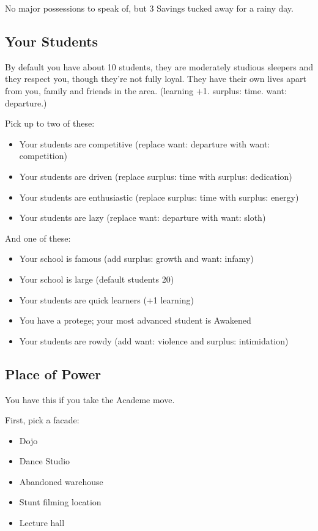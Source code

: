 \documentclass[
]{memoir}
\begin{document}
No major possessions to speak of, but 3 Savings tucked away for a rainy
day.

\hypertarget{your-students}{%
\subsection{Your Students}\label{your-students}}

By default you have about 10 students, they are moderately studious
sleepers and they respect you, though they're not fully loyal. They have
their own lives apart from you, family and friends in the area.
(learning +1. surplus: time. want: departure.)

Pick up to two of these:

\begin{itemize}
\tightlist
\item
  Your students are competitive (replace want: departure with want:
  competition)
\item
  Your students are driven (replace surplus: time with surplus:
  dedication)
\item
  Your students are enthusiastic (replace surplus: time with surplus:
  energy)
\item
  Your students are lazy (replace want: departure with want: sloth)
\end{itemize}

And one of these:

\begin{itemize}
\tightlist
\item
  Your school is famous (add surplus: growth and want: infamy)
\item
  Your school is large (default students 20)
\item
  Your students are quick learners (+1 learning)
\item
  You have a protege; your most advanced student is Awakened
\item
  Your students are rowdy (add want: violence and surplus: intimidation)
\end{itemize}

\hypertarget{place-of-power-1}{%
\subsection{Place of Power}\label{place-of-power-1}}

You have this if you take the Academe move.

First, pick a facade:

\begin{itemize}
\tightlist
\item
  Dojo
\item
  Dance Studio
\item
  Abandoned warehouse
\item
  Stunt filming location
\item
  Lecture hall
\end{itemize}
\end{document}
